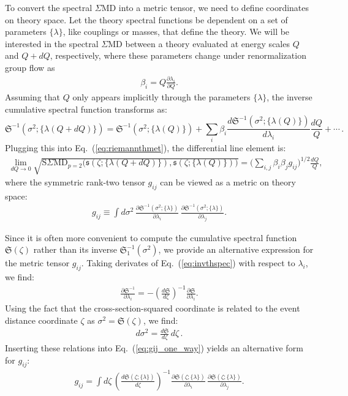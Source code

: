 \documentclass[letterpaper,11pt]{article}
\DeclareRobustCommand{\Eq}[1]{Eq.~(\ref{#1})}
\begin{document}
To convert the spectral $\Sigma$MD into a metric tensor, we need to define coordinates on theory space.
%
Let the theory spectral functions be dependent on a set of parameters $\{\lambda\}$, like couplings or masses, that define the theory.
%
We will be interested in the spectral $\Sigma$MD between a theory evaluated at energy scales $Q$ and $Q+dQ$, respectively, where these parameters change under renormalization group flow as
%
\begin{align}
\beta_i = Q\frac{\partial\lambda_i}{\partial Q}.
\end{align}
%
Assuming that $Q$ only appears implicitly through the parameters $\{\lambda\}$, the inverse cumulative spectral function transforms as:
%
\begin{equation}
{\mathfrak S}^{-1}(\sigma^2;\{\lambda(Q+dQ)\}) = {\mathfrak S}^{-1}(\sigma^2;\{\lambda (Q)\}) + \sum_i \beta_i  \frac{d {\mathfrak S}^{-1}(\sigma^2;\{\lambda (Q)\})}{d \lambda_i}  \frac{dQ}{Q}+\cdots\,.
\end{equation}
%
Plugging this into \Eq{eq:riemannthmet}, the differential line element is:
%
\begin{align}
\label{eq:line_element}
\lim_{dQ\to 0} \sqrt{\text{S$\Sigma$MD}_{p=2}\big(
{\mathfrak s}(\zeta;\{\lambda(Q+dQ)\}),{\mathfrak s}(\zeta;\{\lambda(Q)\})
\big)} =\bigg(\sum_{i,j} \beta_i\beta_j g_{ij} \bigg)^{1/2} \frac{dQ}{Q},
\end{align}
%
where the symmetric rank-two tensor $g_{ij}$ can be viewed as a metric on theory space:
%
\begin{align}
\label{eq:gij_one_way}
g_{ij} \equiv \int d\sigma^2 \, \frac{\partial{\mathfrak S}^{-1}(\sigma^2;\{\lambda\})}{\partial\lambda_i}\,\frac{\partial{\mathfrak S}^{-1}(\sigma^2;\{\lambda\})}{\partial\lambda_j} .
\end{align}


Since it is often more convenient to compute the cumulative spectral function $\mathfrak{S}(\zeta)$ rather than its inverse $\mathfrak{S}_1^{-1}(\sigma^2)$, we provide an alternative expression for the metric tensor $g_{ij}$.
%
Taking derivates of \Eq{eq:invthspec} with respect to $\lambda_i$, we find:
%
\begin{align}
\frac{\partial{\mathfrak S}^{-1}}{\partial\lambda_i} = -\left(\frac{d\mathfrak{S}}{d\zeta} \right)^{-1} \frac{\partial\mathfrak S}{\partial\lambda_i}.
\end{align}
%
Using the fact that the cross-section-squared coordinate is related to the event distance coordinate $\zeta$ as $\sigma^2 = \mathfrak{S}(\zeta)$, we find:
%
\begin{align}
d\sigma^2 = \frac{d\mathfrak{S}}{d\zeta}\,d\zeta\,.
\end{align}
%
Inserting these relations into \Eq{eq:gij_one_way} yields an alternative form for $g_{ij}$:
%
\begin{align}
\label{eq:gij_two_way}
g_{ij} = \int d\zeta\, \left({\frac{d\mathfrak{S}(\zeta;\{\lambda\})}{d\zeta}}\right)^{-1} \frac{\partial \mathfrak{S}(\zeta;\{\lambda\})}{\partial \lambda_i}\,\frac{\partial \mathfrak{S}(\zeta;\{\lambda\})}{\partial \lambda_j}.
\end{align}
\end{document}
